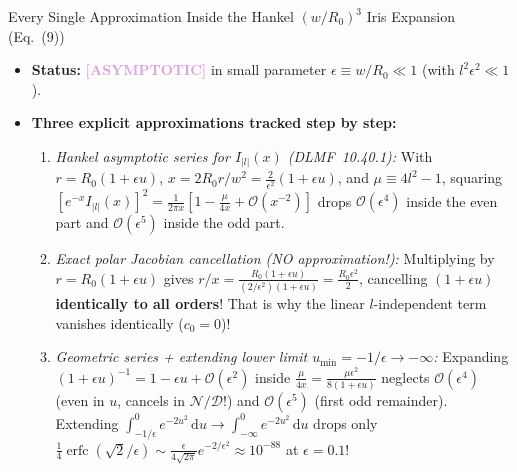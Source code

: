 \documentclass[10pt,letterpaper]{article}
\newcommand{\abs}[1]{\lvert #1 \rvert}
\newcommand{\dd}{\mathrm{d}}
\newcommand{\tagasymp}{\textcolor{plum}{\textbf{[ASYMPTOTIC]}}}
\numberwithin{equation}{section}
\begin{document}
\begin{approxbox}{Every Single Approximation Inside the Hankel $(w/R_0)^3$ Iris Expansion (Eq.~(9))}
\begin{itemize}[leftmargin=1.4em,itemsep=2pt,topsep=1pt]
  \item \textbf{Status:} \tagasymp{} in small parameter $\epsilon \equiv w/R_0 \ll 1$ (with $l^2\epsilon^2 \ll 1$).
  \item \textbf{Three explicit approximations tracked step by step:}
    \begin{enumerate}[leftmargin=1.4em,itemsep=1pt,topsep=1pt]
      \item \emph{Hankel asymptotic series for $I_{\abs{l}}(x)$ (DLMF~10.40.1):} With $r = R_0(1 + \epsilon u)$, $x = 2R_0 r/w^2 = \frac{2}{\epsilon^2}(1+\epsilon u)$, and $\mu \equiv 4l^2 - 1$, squaring $[e^{-x} I_{\abs{l}}(x)]^2 = \frac{1}{2\pi x}[1 - \frac{\mu}{4x} + \mathcal{O}(x^{-2})]$ drops $\mathcal{O}(\epsilon^4)$ inside the even part and $\mathcal{O}(\epsilon^5)$ inside the odd part.
      \item \emph{Exact polar Jacobian cancellation (NO approximation!):} Multiplying by $r = R_0(1+\epsilon u)$ gives $r/x = \frac{R_0(1+\epsilon u)}{(2/\epsilon^2)(1+\epsilon u)} = \frac{R_0\epsilon^2}{2}$, cancelling $(1+\epsilon u)$ \textbf{identically to all orders}! That is why the linear $l$-independent term vanishes identically ($c_0 = 0$)!
      \item \emph{Geometric series + extending lower limit $u_{\min} = -1/\epsilon \to -\infty$:} Expanding $(1+\epsilon u)^{-1} = 1 - \epsilon u + \mathcal{O}(\epsilon^2)$ inside $\frac{\mu}{4x} = \frac{\mu\epsilon^2}{8(1+\epsilon u)}$ neglects $\mathcal{O}(\epsilon^4)$ (even in $u$, cancels in $\mathcal{N}/\mathcal{D}$!) and $\mathcal{O}(\epsilon^5)$ (first odd remainder). Extending $\int_{-1/\epsilon}^0 e^{-2u^2}\,\dd u \to \int_{-\infty}^0 e^{-2u^2}\,\dd u$ drops only $\frac{1}{4}\operatorname{erfc}(\sqrt{2}/\epsilon) \sim \frac{\epsilon}{4\sqrt{2\pi}}e^{-2/\epsilon^2} \approx 10^{-88}$ at $\epsilon = 0.1$!
    \end{enumerate}
\end{itemize}
\end{approxbox}
\end{document}
